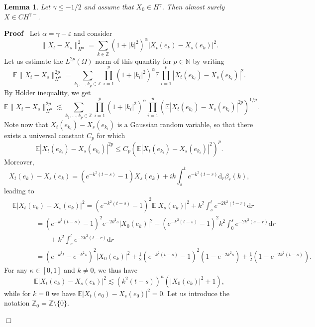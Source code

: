 \documentclass[a4paper,11pt]{article}
\newcommand{\mathd}{\mathrm{d}}
\newenvironment{proof}{\noindent\textbf{Proof\ }}{\hspace*{\fill}$\Box$\medskip}
\newtheorem{lemma}{Lemma}
{\theorembodyfont{\rmfamily}\newtheorem{remark}{Remark}}
\begin{document}
\begin{lemma}\label{lemma:ou-regularity}
Let $\gamma \leqslant - 1 / 2$ and assume that
  $X_0 \in H^{\gamma}$. Then almost surely $X \in C H^{\gamma -}$.
\end{lemma}

\begin{proof}
  Let $\alpha = \gamma - \varepsilon$ and consider
  \[ \| X_t - X_s \|_{H^{\alpha}}^2 = \sum_{k \in \mathbb{Z}} (1 + | k
     |^2)^{\alpha} | X_t (e_k) - X_s (e_k) |^2 . \]
  Let us estimate the $L^{2 p} (\Omega)$ norm of this quantity for $p \in
  \mathbb{N}$ by writing
  \[ \mathbb{E} \| X_t - X_s \|_{H^{\alpha}}^{2 p} = \sum_{k_1, \ldots, k_p
     \in \mathbb{Z}} \prod_{i = 1}^p (1 + | k_i |^2)^{\alpha} \mathbb{E}
     \prod_{i = 1}^p | X_t (e_{k_i}) - X_s (e_{k_i}) |^2 . \]
  By H\"older inequality, we get
  \[ \mathbb{E} \| X_t - X_s \|_{H^{\alpha}}^{2 p} \lesssim \sum_{k_1,
     \ldots, k_p \in \mathbb{Z}} \prod_{i = 1}^p (1 + | k_i |^2)^{\alpha}
     \prod_{i = 1}^p (\mathbb{E} | X_t (e_{k_i}) - X_s (e_{k_i}) |^{2 p})^{1
     / p} . \]
  Note now that $X_t (e_{k_i}) - X_s (e_{k_i})$ is a Gaussian random variable,
  so that there exists a universal constant $C_p$ for which
  \[ \mathbb{E} | X_t (e_{k_i}) - X_s (e_{k_i}) |^{2 p} \leqslant C_p
     (\mathbb{E} | X_t (e_{k_i}) - X_s (e_{k_i}) |^2)^p . \]
  Moreover,
  \[ X_t (e_k) - X_s (e_k) = (e^{- k^2 (t - s)} - 1) X_s (e_k) + ik \int_s^t
     e^{- k^2 (t - r)} \mathd_r \beta_r (k), \]
  leading to
  \begin{align*}
     &\mathbb{E} | X_t (e_k) - X_s (e_k) |^2 = (e^{- k^2 (t - s)} - 1)^2 \mathbb{E} | X_s (e_k) |^2 + k^2 \int_s^t e^{- 2 k^2 (t - r)} \mathd r \\
     &\hspace{40pt} = (e^{- k^2 (t - s)} - 1)^2 e^{- 2 k^2 s} | X_0 (e_k) |^2 + (e^{- k^2 (t - s)} - 1)^2 k^2 \int_0^s e^{- 2 k^2 (s - r)} \mathd r  \\
     &\hspace{40pt} \qquad + k^2 \int_s^t e^{- 2 k^2 (t - r)} \mathd r \\
     &\hspace{40pt} = (e^{- k^2 t} - e^{- k^2 s})^2 | X_0 (e_k) |^2 + \frac{1}{2} (e^{- k^2 (t - s)} - 1)^2 (1 - e^{- 2 k^2 s}) + \frac{1}{2} (1 - e^{- 2 k^2 (t - s)}).
  \end{align*}
  For any $\kappa \in [0, 1]$ and $k \neq 0$, we thus have
  \[ \mathbb{E} | X_t (e_k) - X_s (e_k) |^2 \lesssim (k^2 (t - s))^{\kappa}
     (| X_0 (e_k) |^2 + 1), \]
  while for $k = 0$ we have $\mathbb{E} | X_t (e_0) - X_s (e_0) |^2 = 0$. Let us introduce the notation $\mathbb{Z}_0 =\mathbb{Z} \setminus \{ 0 \}$.

\end{proof}
\end{document}
